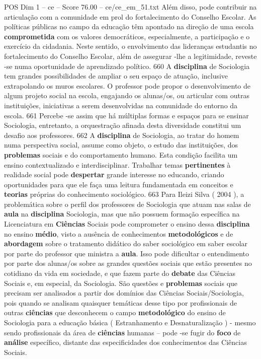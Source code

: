 \begin{textsample}{POS Dim 1 – ce – Score 76.00 – ce/ce\_em\_51.txt}
Além disso, pode contribuir na articulação com a comunidade em prol do fortalecimento do Conselho Escolar.
As políticas públicas no campo da educação têm apontado na direção de uma escola \textbf{comprometida} com os valores democráticos, especialmente, a participação e o exercício da cidadania.
Neste sentido, o envolvimento das lideranças estudantis no fortalecimento do Conselho Escolar, além de assegurar -lhe a legitimidade, reveste -se numa oportunidade de aprendizado político. 660 A \textbf{disciplina} de Sociologia tem grandes possibilidades de ampliar o seu espaço de atuação, inclusive extrapolando os muros escolares.
O professor pode propor o desenvolvimento de algum projeto social na escola, engajando os alunas/os, ou articular com outras instituições, iniciativas a serem desenvolvidas na comunidade do entorno da escola. 661 Percebe -se assim que há múltiplas formas e espaços para se ensinar Sociologia, entretanto, a orquestração afinada desta diversidade constitui um desafio aos professores. 662 A \textbf{disciplina} de Sociologia, ao tratar do homem numa perspectiva social, assume como objeto, o estudo das instituições, dos \textbf{problemas} sociais e do comportamento humano.
Esta condição facilita um ensino contextualizado e interdisciplinar.
Trabalhar temas \textbf{pertinentes} à realidade social pode \textbf{despertar} grande interesse no educando, criando oportunidades para que ele faça uma leitura fundamentada em conceitos e \textbf{teorias} próprias do conhecimento sociológico. 663 Para Ileizi Silva ( 2004 ), a problemática sobre o perfil dos professores de Sociologia que atuam nas salas de \textbf{aula} na \textbf{disciplina} Sociologia, mas que não possuem formação específica na Licenciatura em \textbf{Ciências} Sociais pode comprometer o ensino dessa \textbf{disciplina} no ensino \textbf{médio}, visto a ausência de conhecimentos \textbf{metodológicos} e de \textbf{abordagem} sobre o tratamento didático do saber sociológico em saber escolar por parte do professor que ministra a \textbf{aula}.
Isso pode dificultar o entendimento por parte dos alunas/os sobre as grandes questões sociais que estão presentes no cotidiano da vida em sociedade, e que fazem parte do \textbf{debate} das Ciências Sociais e, em especial, da Sociologia.
São questões e \textbf{problemas} sociais que precisam ser analisados a partir dos domínios das Ciências Sociais/Sociologia, pois quando se analisam quaisquer temáticas desse tipo por profissionais de outras \textbf{ciências} que desconhecem o campo \textbf{metodológico} do ensino de Sociologia para a educação básica ( Estranhamento e Desnaturalização ) - mesmo sendo profissionais da área de \textbf{ciências} humanas – pode -se fugir do \textbf{foco} de \textbf{análise} específico, distante das especificidades dos conhecimentos das Ciências Sociais.

\end{textsample}
